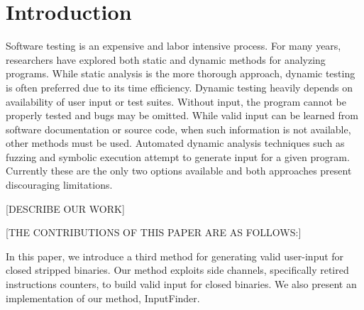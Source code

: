 \documentclass[10pt,twocolumn]{article}
\def \tool {InputFinder}
\begin{document}


\begin{abstract}
User input and test suites are crucial to dynamic program analysis techniques.
Without extensive testing of the program, bugs may be omitted.
While fuzzing and symbolic execution can be successful in finding input, both approaches have limitations.
To date, there is no alternative method for generating input for closed (source) binaries.
In this paper we present an architecture and source code independent, instrumentation-free technique for generating valid input for closed stripped binaries and its implementation \tool{}.
\tool{} exploits side channels to automatically build valid user-input allowing for more extensive testing.
Additionally, \tool{} can determine input buffer size and make inferences about input types (e.g. alphabetic, numeric, alphanumeric, etc.).
\end{abstract}

\section{Introduction}

Software testing is an expensive and labor intensive process.
For many years, researchers have explored both static and dynamic methods for analyzing programs.
While static analysis is the more thorough approach, dynamic testing is often preferred due to its time efficiency.
Dynamic testing heavily depends on availability of user input or test suites.
Without input, the program cannot be properly tested and bugs may be omitted.
While valid input can be learned from software documentation or source code, when such information is not available, other methods must be used.
Automated dynamic analysis techniques such as fuzzing and symbolic execution attempt to generate input for a given program.
Currently these are the only two options available and both approaches present discouraging limitations.

[DESCRIBE OUR WORK]

[THE CONTRIBUTIONS OF THIS PAPER ARE AS FOLLOWS:]

In this paper, we introduce a third method for generating valid user-input for closed stripped binaries. 
Our method exploits side channels, specifically retired instructions counters, to build valid input for closed binaries.
We also present an implementation of our method, \tool{}.
\end{document}
